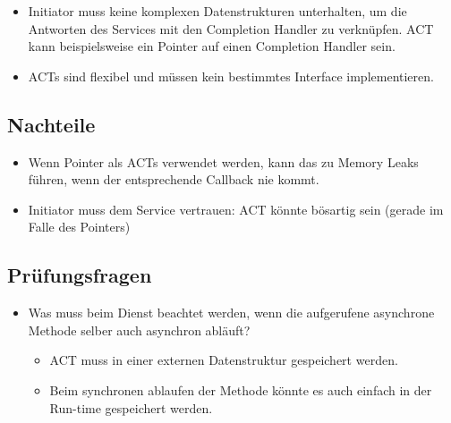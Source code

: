 \begin{itemize}
	\item Initiator muss keine komplexen Datenstrukturen unterhalten, um die Antworten des Services mit den Completion Handler zu verknüpfen. ACT kann beispielsweise ein Pointer auf einen Completion Handler sein.
	\item ACTs sind flexibel und müssen kein bestimmtes Interface implementieren.
\end{itemize}

\subsection*{Nachteile}

\begin{itemize}
	\item Wenn Pointer als ACTs verwendet werden, kann das zu Memory Leaks führen, wenn der entsprechende Callback nie kommt.
	\item Initiator muss dem Service vertrauen: ACT könnte bösartig sein (gerade im Falle des Pointers)
\end{itemize}


\subsection*{Prüfungsfragen}

\begin{itemize}
	\item Was muss beim Dienst beachtet werden, wenn die aufgerufene asynchrone Methode selber auch asynchron abläuft?
	\begin{itemize}
		\item ACT muss in einer externen Datenstruktur gespeichert werden.
		\item Beim synchronen ablaufen der Methode könnte es auch einfach in der Run-time gespeichert werden.
	\end{itemize}
\end{itemize}
